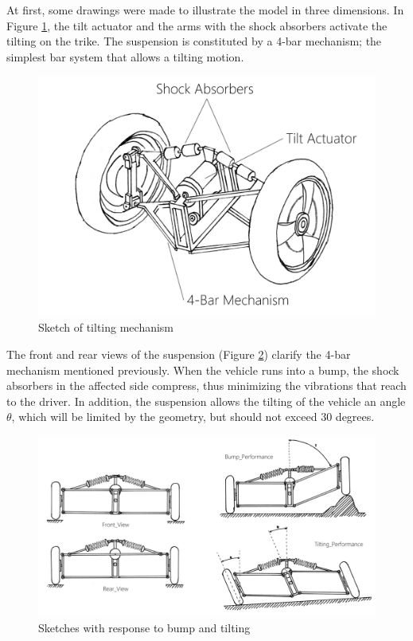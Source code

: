 At first, some drawings were made to illustrate the model in three dimensions.
In Figure \ref{sketch_1}, the tilt actuator and the arms with the shock absorbers activate the tilting on the trike. The suspension is constituted by a 4-bar mechanism; the simplest bar system that allows a tilting motion.
\begin{figure}[h!]
	\includegraphics[width=0.95\linewidth]{figs/04/Imagen5}
	\caption{Sketch of tilting mechanism}
	\label{sketch_1}
\end{figure}

The front and rear views of the suspension (Figure \ref{sketch_2}) clarify the 4-bar mechanism mentioned previously. When the vehicle runs into a bump, the shock absorbers in the affected side compress, thus minimizing the vibrations that reach to the driver. In addition, the suspension allows the tilting of the vehicle an angle $\theta$, which will be limited by the geometry, but should not exceed 30 degrees.
\begin{figure}[h!]
	\includegraphics[width=1.0\linewidth]{figs/04/Imagen6}
	\caption{Sketches with response to bump and tilting}
	\label{sketch_2}
\end{figure}

